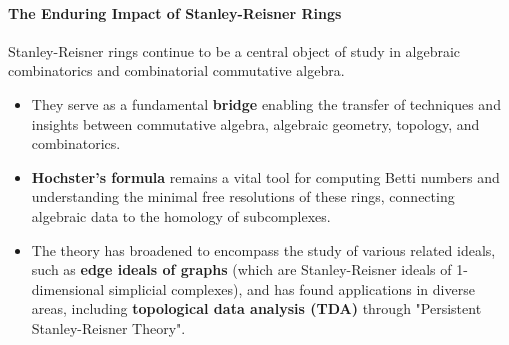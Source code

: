 \documentclass[12pt]{article}
\theoremstyle{definition}
\numberwithin{equation}{subsection}
\begin{document}
\paragraph{The Enduring Impact of Stanley-Reisner Rings}
Stanley-Reisner rings continue to be a central object of study in algebraic combinatorics and combinatorial commutative algebra.
\begin{itemize}
\item They serve as a fundamental \textbf{bridge} enabling the transfer of techniques and insights between commutative algebra, algebraic geometry, topology, and combinatorics.
\item \textbf{Hochster's formula} remains a vital tool for computing Betti numbers and understanding the minimal free resolutions of these rings, connecting algebraic data to the homology of subcomplexes.
\item The theory has broadened to encompass the study of various related ideals, such as \textbf{edge ideals of graphs} (which are Stanley-Reisner ideals of 1-dimensional simplicial complexes), and has found applications in diverse areas, including \textbf{topological data analysis (TDA)} through "Persistent Stanley-Reisner Theory".
\end{itemize}   
\end{document}
